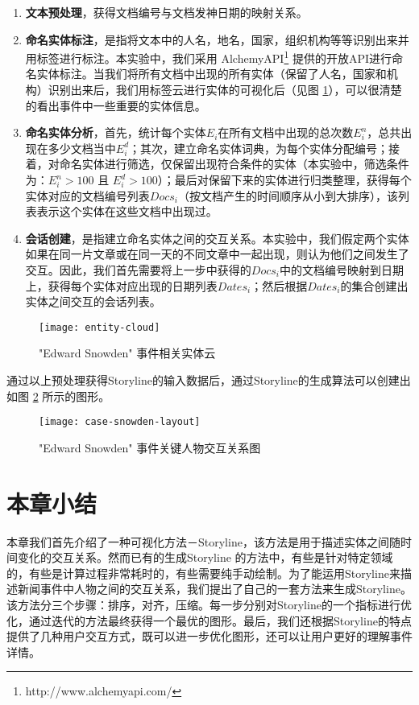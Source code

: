 \begin{enumerate}[(1)]
\item \textbf{文本预处理}，获得文档编号与文档发神日期的映射关系。
\item \textbf{命名实体标注}，是指将文本中的人名，地名，国家，组织机构等等识别出来并用标签进行标注。本实验中，我们采用 AlchemyAPI\footnote{http://www.alchemyapi.com/} 提供的开放API进行命名实体标注。当我们将所有文档中出现的所有实体（保留了人名，国家和机构）识别出来后，我们用标签云进行实体的可视化后（见图 \ref{fig:entity-cloud}），可以很清楚的看出事件中一些重要的实体信息。
\item \textbf{命名实体分析}，首先，统计每个实体$E_i$在所有文档中出现的总次数$E_i^n$，总共出现在多少文档当中$E_i^d$；其次，建立命名实体词典，为每个实体分配编号；接着，对命名实体进行筛选，仅保留出现符合条件的实体（本实验中，筛选条件为：$E_i^n > 100$ 且 $E_i^d > 100$）；最后对保留下来的实体进行归类整理，获得每个实体对应的文档编号列表$Docs_i$（按文档产生的时间顺序从小到大排序），该列表表示这个实体在这些文档中出现过。
\item \textbf{会话创建}，是指建立命名实体之间的交互关系。本实验中，我们假定两个实体如果在同一片文章或在同一天的不同文章中一起出现，则认为他们之间发生了交互。因此，我们首先需要将上一步中获得的$Docs_i$中的文档编号映射到日期上，获得每个实体对应出现的日期列表$Dates_i$；然后根据$Dates_i$的集合创建出实体之间交互的会话列表。
\end{enumerate}
\begin{figure}[htb]
    \centering
        \texttt{[image: entity-cloud]}
    \caption{"Edward Snowden" 事件相关实体云}
    \label{fig:entity-cloud}
\end{figure}

通过以上预处理获得Storyline的输入数据后，通过Storyline的生成算法可以创建出如图 \ref{fig:case-snowden-layout} 所示的图形。
\begin{figure}[htb]
    \centering
        \texttt{[image: case-snowden-layout]}
    \caption{"Edward Snowden" 事件关键人物交互关系图}
    \label{fig:case-snowden-layout}
\end{figure}

\section{本章小结}
本章我们首先介绍了一种可视化方法－Storyline，该方法是用于描述实体之间随时间变化的交互关系。然而已有的生成Storyline 的方法中，有些是针对特定领域的，有些是计算过程非常耗时的，有些需要纯手动绘制。为了能运用Storyline来描述新闻事件中人物之间的交互关系，我们提出了自己的一套方法来生成Storyline。该方法分三个步骤：排序，对齐，压缩。每一步分别对Storyline的一个指标进行优化，通过迭代的方法最终获得一个最优的图形。最后，我们还根据Storyline的特点提供了几种用户交互方式，既可以进一步优化图形，还可以让用户更好的理解事件详情。
